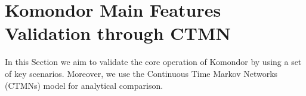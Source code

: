 \documentclass[a4paper]{article}
\begin{document}

\section{Komondor Main Features Validation through CTMN}
\label{section:validations}
	In this Section we aim to validate the core operation of Komondor by using a set of key scenarios. Moreover, we use the Continuous Time Markov Networks (CTMNs) model \cite{bellalta2014throughput} for analytical comparison. 

\end{document}

